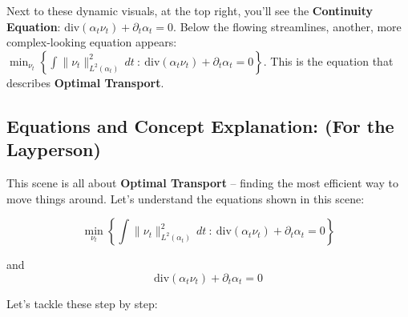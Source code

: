 \documentclass{article}
\begin{document}
Next to these dynamic visuals, at the top right, you'll see the \textbf{Continuity Equation}: \( \text{div}(\alpha_t \nu_t) + \partial_t \alpha_t = 0 \). Below the flowing streamlines, another, more complex-looking equation appears: \( \min_{\nu_t} \left\{ \int \|\nu_t\|_{L^2(\alpha_t)}^2 \, dt \ : \ \text{div}(\alpha_t \nu_t) + \partial_t \alpha_t = 0 \right\} \).  This is the equation that describes \textbf{Optimal Transport}.

\subsection*{Equations and Concept Explanation: (For the Layperson)}

This scene is all about \textbf{Optimal Transport} – finding the most efficient way to move things around. Let's understand the equations shown in this scene:

\[
\min_{\nu_t} \left\{ \int \|\nu_t\|_{L^2(\alpha_t)}^2 \, dt \ : \ \text{div}(\alpha_t \nu_t) + \partial_t \alpha_t = 0 \right\}
\]

and
\[
\text{div}(\alpha_t \nu_t) + \partial_t \alpha_t = 0
\]

Let's tackle these step by step:
\end{document}
